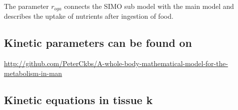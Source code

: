\documentclass{IEEEtran}
\begin{document}
The parameter $r_{oga}$ connects the SIMO sub model with the main model and describes the uptake of nutrients after ingestion of food.
\subsection{Kinetic parameters can be found on}
\url{http://github.com/PeterCkbs/A-whole-body-mathematical-model-for-the-metabolism-in-man}
\subsection{Kinetic equations in tissue k}

    


\end{document}
